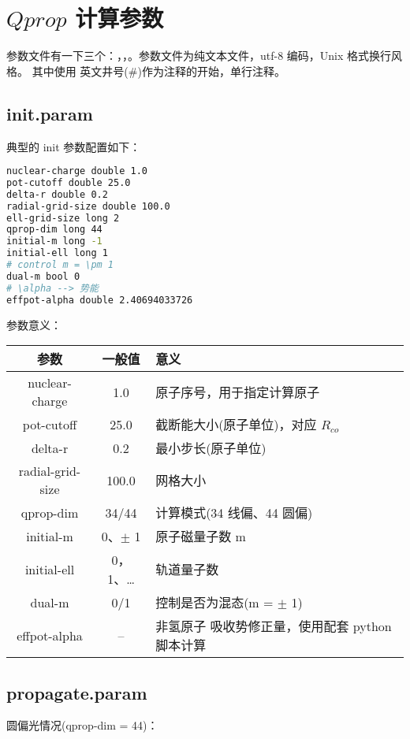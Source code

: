\section{$Qprop$ 计算参数}

参数文件有一下三个：，，。参数文件为纯文本文件，utf-8 编码，Unix 格式换行风格。
其中使用 英文井号(\#)作为注释的开始，单行注释。

\subsection{init.param}
典型的 init 参数配置如下：
\begin{lstlisting}[language=bash]
nuclear-charge double 1.0
pot-cutoff double 25.0
delta-r double 0.2
radial-grid-size double 100.0
ell-grid-size long 2
qprop-dim long 44
initial-m long -1
initial-ell long 1
# control m = \pm 1
dual-m bool 0
# \alpha --> 势能
effpot-alpha double 2.40694033726
\end{lstlisting}

参数意义：
\begin{table}[htbp]
    \begin{tabular}{c|c|l}
    \hline
    参数 & 一般值 & 意义 \\
    \hline
    nuclear-charge & 1.0 & 原子序号，用于指定计算原子 \\
    pot-cutoff & 25.0 & 截断能大小(原子单位)，对应 $R_{co}$ \\
    delta-r & 0.2 & 最小步长(原子单位) \\
    radial-grid-size & 100.0 & 网格大小 \\
    qprop-dim & 34/44 & 计算模式(34 线偏、44 圆偏) \\
    initial-m & 0、$\pm$ 1 & 原子磁量子数 m \\
    initial-ell & 0，1、\dots & 轨道量子数 \\
    dual-m & 0/1 & 控制是否为混态(m = $\pm$ 1) \\
    effpot-alpha & -- & 非氢原子 吸收势修正量，使用配套 python 脚本计算 \\
    \hline
    \end{tabular}
\end{table}


\subsection{propagate.param}
圆偏光情况(qprop-dim = 44)：

